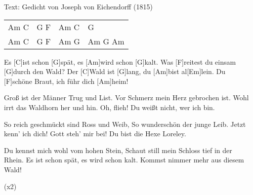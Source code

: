 {\color{gray}Text: Gedicht von Joseph von Eichendorff {\small(1815)}}


\begin{guitar}
	
	{\footnotesize\begin{tabular}{l|l|l|l}
		Am C & G F & Am C & G \\
		Am C & G F & Am G & Am G Am
	\end{tabular}}
	
	Es [C]ist schon [G]spät, es [Am]wird schon [G]kalt.
	Was [F]reitest du einsam [G]durch den Wald?
	Der [C]Wald ist [G]lang, du [Am]bist al[Em]lein.
	Du [F]schöne Braut, ich führ dich [Am]heim!
	
	
	Groß ist der Männer Trug und List.
	Vor Schmerz mein Herz gebrochen ist.
	Wohl irrt das Waldhorn her und hin.
	Oh, flieh! Du weißt nicht, wer ich bin.
	
	
	So reich geschmückt sind Ross und Weib,
	So wunderschön der junge Leib.
	Jetzt kenn' ich dich! Gott steh' mir bei!
	Du bist die Hexe Loreley.
	
	
	Du kennst mich wohl vom hohen Stein,
	Schaut still mein Schloss tief in der Rhein.
	Es ist schon spät, es wird schon kalt.
	Kommst nimmer mehr aus diesem Wald!
	
	 (x2)
\end{guitar}